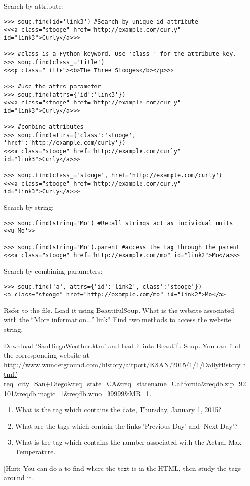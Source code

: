 Search by attribute:
\begin{lstlisting}
>>> soup.find(id='link3') #Search by unique id attribute
<<<a class="stooge" href="http://example.com/curly" id="link3">Curly</a>>>

>>> #class is a Python keyword. Use 'class_' for the attribute key.
>>> soup.find(class_='title')
<<<p class="title"><b>The Three Stooges</b></p>>>

>>> #use the attrs parameter
>>> soup.find(attrs={'id':'link3'})
<<<a class="stooge" href="http://example.com/curly" id="link3">Curly</a>>>

>>> #combine attributes
>>> soup.find(attrs={'class':'stooge', 'href':'http://example.com/curly'})
<<<a class="stooge" href="http://example.com/curly" id="link3">Curly</a>>>

>>> soup.find(class_='stooge', href='http://example.com/curly')
<<<a class="stooge" href="http://example.com/curly" id="link3">Curly</a>>>
\end{lstlisting}

Search by string:
\begin{lstlisting}
>>> soup.find(string='Mo') #Recall strings act as individual units
<<u'Mo'>>

>>> soup.find(string='Mo').parent #access the tag through the parent
<<<a class="stooge" href="http://example.com/mo" id="link2">Mo</a>>>
\end{lstlisting}

Search by combining parameters:
\begin{lstlisting}
>>> soup.find('a', attrs={'id':'link2','class':'stooge'})
<a class="stooge" href="http://example.com/mo" id="link2">Mo</a>
\end{lstlisting}

\begin{problem}
Refer to the  file.
Load it using BeautifulSoup.
What is the website associated with the ``More information...'' link?
Find two methods to access the website string.
\end{problem}

\begin{problem}
Download 'SanDiegoWeather.htm' and load it into BeautifulSoup.
You can find the corresponding website at \url{http://www.wunderground.com/history/airport/KSAN/2015/1/1/DailyHistory.html?req_city=San+Diego&req_state=CA&req_statename=California&reqdb.zip=92101&reqdb.magic=1&reqdb.wmo=99999&MR=1}.
\begin{enumerate}
\item What is the tag which contains the date, Thursday, January 1, 2015?
\item What are the tags which contain the links 'Previous Day' and 'Next Day'?
\item What is the tag which contains the number associated with the Actual Max Temperature.
\end{enumerate}
[Hint: You can do a  to find where the text is in the HTML, then study the tags around it.]
\end{problem}


